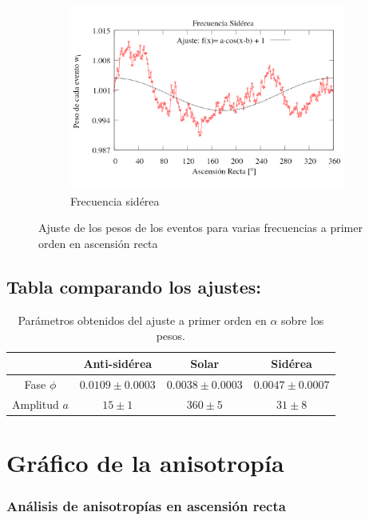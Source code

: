 \begin{figure}[H]
\begin{subfigure}{.5\textwidth}
	\centering
	\includegraphics[width=\linewidth]{eventos_RA_ajuste_cos_siderea_v2.png}
	\caption{Frecuencia sidérea}
	\label{fig:ajuste_siderea}
\end{subfigure}%
\caption{Ajuste de los pesos de los eventos para varias frecuencias a primer orden en ascensión recta}
\end{figure}

	
\subsection{Tabla comparando los ajustes:}
		
		\begin{table}[H]
		\centering
		\begin{tabular}{c|c|c|c}
					& Anti-sidérea			& Solar 				& Sidérea\\ \hline
		Fase $\phi$ & $0.0109\pm 0.0003 $ 	&	$0.0038 \pm 0.0003$	&  $0.0047\pm 0.0007$		\\
		Amplitud $a$& $15    \pm 1$ 		&   $360 \pm 5   $ 		&  $31    \pm 8    $ 		\\
		\end{tabular}
		\caption{Parámetros obtenidos del ajuste a primer orden en $\alpha$ sobre los pesos.}
		\end{table}


\section{Gráfico de la anisotropía}
		
	\subsubsection{Análisis de anisotropías en ascensión recta}
		
